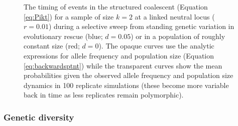 \documentclass[]{article}
\begin{document}
\begin{figure}[htb]
\caption{
The timing of events in the structured coalescent (Equation \ref{eq:Pikt}) for a sample of size $k=2$ at a linked neutral locus ($r=0.01$) during a selective sweep from standing genetic variation in evolutionary rescue (blue; $d=0.05$) or in a population of roughly constant size (red; $d=0$).
The opaque curves use the analytic expressions for allele frequency and population size (Equation \ref{eq:backwardsptnt}) while the transparent curves show the mean probabilities given the observed allele frequency and population size dynamics in 100 replicate simulations (these become more variable back in time as less replicates remain polymorphic).
}%
\label{fig:rescueSGV_timing}
\end{figure}

\subsubsection*{Genetic diversity}
\end{document}
